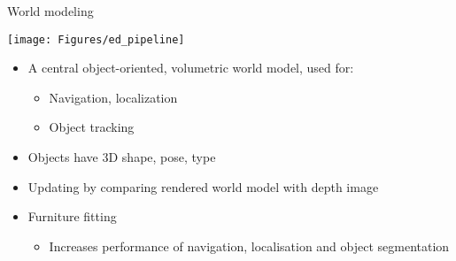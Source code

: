 \documentclass[12pt,a4paper]{article}
\newcommand{\emptylogo}{\texttt{[image: Figures/Empty]}}
\begin{document}
\begin{slidetop}
\begin{multicols}{2}
\vfill
\columnbreak

\begin{bclogo}[couleur = white, arrondi = 0.25, couleurBord = tuedarkblue , barre = none, logo=\emptylogo]{\textcolor{tuedarkblue}{World modeling}}
\medskip %
\begin{minipage}[T]{\textwidth}
    \begin{center}
        \texttt{[image: Figures/ed\_pipeline]}
    \end{center}
\end{minipage}
\begin{itemize}[itemsep = 0pt, parsep = 0pt, leftmargin=15pt]
	\item A central object-oriented, volumetric world model, used for:	
	\begin{itemize}[itemsep = 0pt, parsep = 0pt, leftmargin=15pt]
		\item Navigation, localization
		\item Object tracking
	\end{itemize}
	\item Objects have 3D shape, pose, type
	\item Updating by comparing rendered world model with depth image
    \item Furniture fitting
    \begin{itemize}[itemsep = 0pt, parsep = 0pt, leftmargin=15pt]
		\item Increases performance of navigation, localisation and object segmentation
	\end{itemize}


\end{itemize}
\end{bclogo}

\vspace{-0.83cm} %


\end{multicols}
\end{slidetop}
\end{document}
